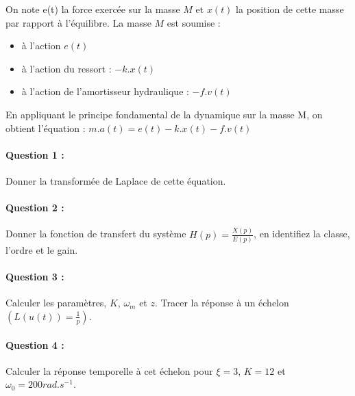  
On note e(t) la force exercée sur la masse $M$ et $x(t)$ la position de cette masse par rapport à l'équilibre. La masse $M$ est soumise :  
\begin{itemize}
 \item à l'action $e(t)$
 \item à l'action du ressort : $-k.x(t)$
 \item à l'action de l'amortisseur hydraulique : $-f.v(t)$
\end{itemize}

En appliquant le principe fondamental de la dynamique sur la masse M, on obtient l'équation :
$m.a(t)=e(t)-k.x(t)-f.v(t)$

\paragraph{Question 1 :} Donner la transformée de Laplace de cette équation. 
\paragraph{Question 2 :} Donner la fonction de transfert du système $H(p)=\frac{X(p)}{E(p)}$, en identifiez la classe, l'ordre et le gain. 
\paragraph{Question 3 :} Calculer les paramètres, $K$, $\omega_m$ et $z$. Tracer la réponse à un échelon $(L(u(t))=\frac{1}{p})$. 
\paragraph{Question 4 :} Calculer la réponse temporelle à cet échelon pour $\xi=3$, $K=12$ et $\omega_0=200rad.s^{-1}$.

